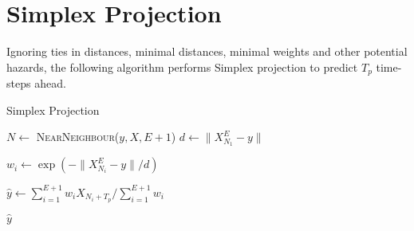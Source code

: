 \documentclass{article}
\theoremstyle{definition}
\begin{document}
\section{Simplex Projection}\label{section:simplex}
Ignoring ties in distances, minimal distances, minimal weights and
other potential hazards, the following algorithm performs Simplex
projection to predict $T_p$ time-steps ahead.
\begin{algorithm}
  \caption{Simplex Projection \cite{SugiharaMay90}}\label{alg:simplex}
  \begin{algorithmic}[1]

    \State $N \gets$ \textsc{NearNeighbour}($y, X, E+1$)
    \State $d \gets  \| X_{N_1}^{E} - y\|$ 

    \State $w_i \gets \exp (-\| X_{N_i}^{E} - y\| / d )$
    \EndFor

    \State $\hat{y} \gets \sum_{i = 1}^{E+1} w_iX_{N_i+T_p} /
    \sum_{i = 1}^{E+1} w_i$ 
    
    \State \Return $\hat{y}$
    \EndProcedure
  \end{algorithmic}
\end{algorithm}
\end{document}
